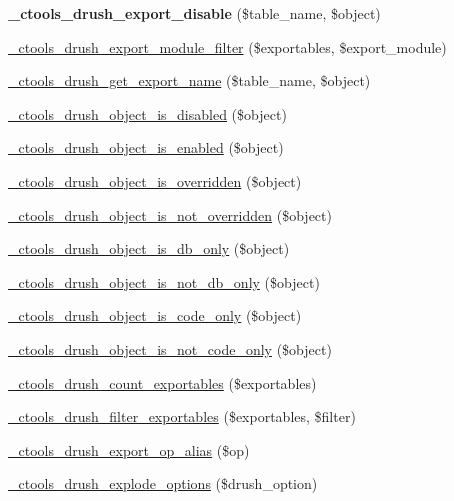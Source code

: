 \begin{DoxyCompactItemize}
\item 
\hypertarget{ctools_8drush_8inc_a44278d90fd4421f8bc3870da2a822c63}{
{\bfseries \_\-ctools\_\-drush\_\-export\_\-disable} (\$table\_\-name, \$object)}
\label{ctools_8drush_8inc_a44278d90fd4421f8bc3870da2a822c63}

\item 
\hyperlink{ctools_8drush_8inc_a354ecd84880e806e6e1851db41918e8b}{\_\-ctools\_\-drush\_\-export\_\-module\_\-filter} (\$exportables, \$export\_\-module)
\item 
\hyperlink{ctools_8drush_8inc_a6bf2e880260509b600562786eb63c79f}{\_\-ctools\_\-drush\_\-get\_\-export\_\-name} (\$table\_\-name, \$object)
\item 
\hyperlink{ctools_8drush_8inc_a6f6ccf63b028f6ea83854ca77cf2f5b3}{\_\-ctools\_\-drush\_\-object\_\-is\_\-disabled} (\$object)
\item 
\hyperlink{ctools_8drush_8inc_ae679f0bbeb2c782f356abaa73059f951}{\_\-ctools\_\-drush\_\-object\_\-is\_\-enabled} (\$object)
\item 
\hyperlink{ctools_8drush_8inc_af6fec9d8bf469b68462241cdb045bc5f}{\_\-ctools\_\-drush\_\-object\_\-is\_\-overridden} (\$object)
\item 
\hyperlink{ctools_8drush_8inc_af2eb8efa4f7b5c4e54cde94156c41b0f}{\_\-ctools\_\-drush\_\-object\_\-is\_\-not\_\-overridden} (\$object)
\item 
\hyperlink{ctools_8drush_8inc_a63cc2c859d1a8e4b2a217ea60444e60c}{\_\-ctools\_\-drush\_\-object\_\-is\_\-db\_\-only} (\$object)
\item 
\hyperlink{ctools_8drush_8inc_adf0e2ab5067154d17227647a1de56e05}{\_\-ctools\_\-drush\_\-object\_\-is\_\-not\_\-db\_\-only} (\$object)
\item 
\hyperlink{ctools_8drush_8inc_a991c0c74a1fbc625ea24e0a1c94ef79a}{\_\-ctools\_\-drush\_\-object\_\-is\_\-code\_\-only} (\$object)
\item 
\hyperlink{ctools_8drush_8inc_ad9023eee278d62063d6c8e80b533a340}{\_\-ctools\_\-drush\_\-object\_\-is\_\-not\_\-code\_\-only} (\$object)
\item 
\hyperlink{ctools_8drush_8inc_a6319e6e637798f0886e2c008106e1739}{\_\-ctools\_\-drush\_\-count\_\-exportables} (\$exportables)
\item 
\hyperlink{ctools_8drush_8inc_aed8b85aea23dc7f24f9c733712bdb4f3}{\_\-ctools\_\-drush\_\-filter\_\-exportables} (\$exportables, \$filter)
\item 
\hyperlink{ctools_8drush_8inc_a58e51a8f723bd1f34b7b881d57b23726}{\_\-ctools\_\-drush\_\-export\_\-op\_\-alias} (\$op)
\item 
\hyperlink{ctools_8drush_8inc_aacf474d9507f8bc39ad18da701b890d3}{\_\-ctools\_\-drush\_\-explode\_\-options} (\$drush\_\-option)
\end{DoxyCompactItemize}



